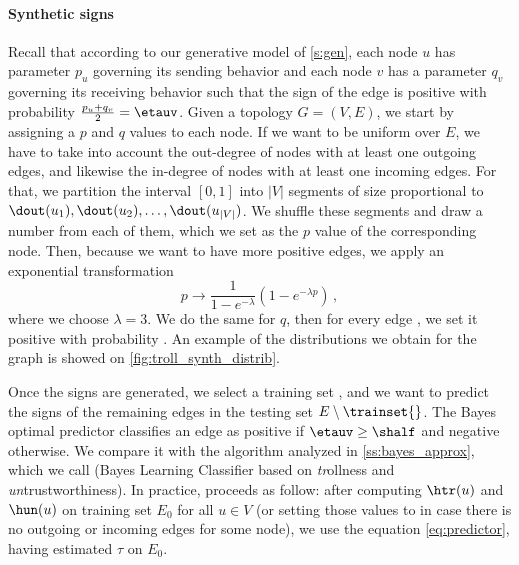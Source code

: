 \begin{newcontent}
\paragraph{Synthetic signs}

Recall that according to our generative model of \autoref{s:gen}, each node $u$ has parameter $p_u$
governing its sending behavior and each node $v$ has a parameter $q_v$ governing its receiving
behavior such that the sign of the edge \euv{} is positive with probability $\frac{p_u+q_v}{2} =
\etauv$. Given a topology $G=(V,E)$, we start by assigning a $p$ and $q$ values to each node. If we
want \etauv{} to be uniform over $E$, we have to take into account the out-degree of nodes with at
least one outgoing edges, and likewise the in-degree of nodes with at least one incoming edges. For
that, we partition the interval $[0,1]$ into $|V|$ segments of size proportional to $\dout(u_1),
\dout(u_2), \ldots, \dout(u_{|V|})$. We shuffle these segments and draw a number \uar{} from each of
them, which we set as the $p$ value of the corresponding node. Then, because we want to have more
positive edges, we apply an exponential transformation \[ p \rightarrow \frac{1}{1-e^{-\lambda}}
\left( 1-e^{-\lambda p} \right) \,,\] where we choose $\lambda=3$. We do the same for $q$, then for
every edge \euv{}, we set it positive with probability \etauv{}. An example of the distributions we
obtain for the \wik{} graph is showed on \autoref{fig:troll_synth_distrib}.

Once the signs are generated, we select a training set \trainset{} \uar{}, and we want to predict
the signs of the remaining edges in the testing set $E\setminus \trainset{}$. The Bayes optimal
predictor classifies an edge \euv{} as positive if $\etauv \geq \shalf$ and negative otherwise. 
We compare it with the algorithm analyzed in \autoref{ss:bayes_approx}, which we call \usrule{}
(Bayes Learning Classifier based on \emph{tr}ollness and \emph{un}trustworthiness). In practice,
\usrule{} proceeds as follow: after computing $\htr(u)$ and $\hun(u)$ on training set $E_0$ for all
$u \in V$ (or setting those values to \shalf{} in case there is no outgoing or incoming edges for
some node), we use the equation \eqref{eq:predictor}, having estimated $\tau$ on $E_0$.


\end{newcontent}
